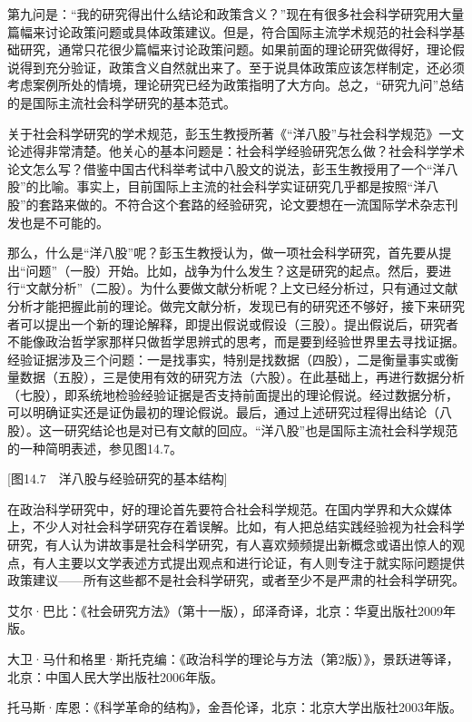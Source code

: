 第九问是：“我的研究得出什么结论和政策含义？”现在有很多社会科学研究用大量篇幅来讨论政策问题或具体政策建议。但是，符合国际主流学术规范的社会科学基础研究，通常只花很少篇幅来讨论政策问题。如果前面的理论研究做得好，理论假说得到充分验证，政策含义自然就出来了。至于说具体政策应该怎样制定，还必须考虑案例所处的情境，理论研究已经为政策指明了大方向。总之，“研究九问”总结的是国际主流社会科学研究的基本范式。

关于社会科学研究的学术规范，彭玉生教授所著《“洋八股”与社会科学规范》一文论述得非常清楚。他关心的基本问题是：社会科学经验研究怎么做？社会科学学术论文怎么写？借鉴中国古代科举考试中八股文的说法，彭玉生教授用了一个“洋八股”的比喻。事实上，目前国际上主流的社会科学实证研究几乎都是按照“洋八股”的套路来做的。不符合这个套路的经验研究，论文要想在一流国际学术杂志刊发也是不可能的。

那么，什么是“洋八股”呢？彭玉生教授认为，做一项社会科学研究，首先要从提出“问题”（一股）开始。比如，战争为什么发生？这是研究的起点。然后，要进行“文献分析”（二股）。为什么要做文献分析呢？上文已经分析过，只有通过文献分析才能把握此前的理论。做完文献分析，发现已有的研究还不够好，接下来研究者可以提出一个新的理论解释，即提出假说或假设（三股）。提出假说后，研究者不能像政治哲学家那样只做哲学思辨式的思考，而是要到经验世界里去寻找证据。经验证据涉及三个问题：一是找事实，特别是找数据（四股），二是衡量事实或衡量数据（五股），三是使用有效的研究方法（六股）。在此基础上，再进行数据分析（七股），即系统地检验经验证据是否支持前面提出的理论假说。经过数据分析，可以明确证实还是证伪最初的理论假说。最后，通过上述研究过程得出结论（八股）。这一研究结论也是对已有文献的回应。“洋八股”也是国际主流社会科学规范的一种简明表述，参见图14.7。

[图14.7　洋八股与经验研究的基本结构]

在政治科学研究中，好的理论首先要符合社会科学规范。在国内学界和大众媒体上，不少人对社会科学研究存在着误解。比如，有人把总结实践经验视为社会科学研究，有人认为讲故事是社会科学研究，有人喜欢频频提出新概念或语出惊人的观点，有人主要以文学表述方式提出观点和进行论证，有人则专注于就实际问题提供政策建议——所有这些都不是社会科学研究，或者至少不是严肃的社会科学研究。


艾尔·巴比：《社会研究方法》（第十一版），邱泽奇译，北京：华夏出版社2009年版。

大卫·马什和格里·斯托克编：《政治科学的理论与方法（第2版）》，景跃进等译，北京：中国人民大学出版社2006年版。

托马斯·库恩：《科学革命的结构》，金吾伦译，北京：北京大学出版社2003年版。
